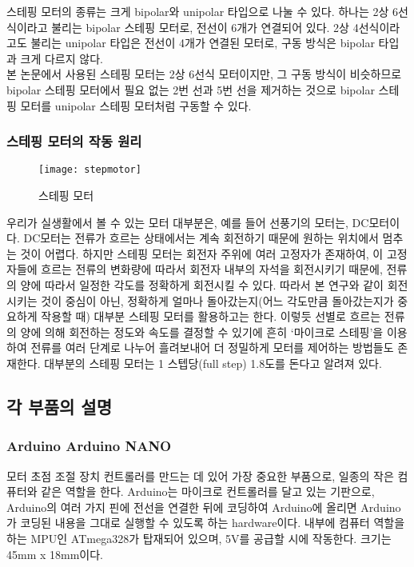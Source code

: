 스테핑 모터의 종류는 크게 bipolar와 unipolar 타입으로 나눌 수 있다. 하나는 2상 6선식이라고 불리는 bipolar 스테핑 모터로, 전선이 6개가 연결되어 있다. 2상 4선식이라고도 불리는 unipolar 타입은 전선이 4개가 연결된 모터로, 구동 방식은 bipolar 타입과 크게 다르지 않다.\\
본 논문에서 사용된 스테핑 모터는 2상 6선식 모터이지만, 그 구동 방식이 비슷하므로 bipolar 스테핑 모터에서 필요 없는 2번 선과 5번 선을 제거하는 것으로 bipolar 스테핑 모터를 unipolar 스테핑 모터처럼 구동할 수 있다.

\subsubsection{스테핑 모터의 작동 원리}

\begin{wrapfigure}{l}{0.5\textwidth}
	\texttt{[image: stepmotor]}
	\caption{스테핑 모터}
	\label{fig:stepmotor}
\end{wrapfigure}
우리가 실생활에서 볼 수 있는 모터 대부분은, 예를 들어 선풍기의 모터는, DC모터이다. DC모터는 전류가 흐르는 상태에서는 계속 회전하기 때문에 원하는 위치에서 멈추는 것이 어렵다. 하지만 스테핑 모터는 회전자 주위에 여러 고정자가 존재하여, 이 고정자들에 흐르는 전류의 변화량에 따라서 회전자 내부의 자석을 회전시키기 때문에, 전류의 양에 따라서 일정한 각도를 정확하게 회전시킬 수 있다. 따라서 본 연구와 같이 회전시키는 것이 중심이 아닌, 정확하게 얼마나 돌아갔는지(어느 각도만큼 돌아갔는지가 중요하게 작용할 때) 대부분 스테핑 모터를 활용하고는 한다. 이렇듯 선별로 흐르는 전류의 양에 의해 회전하는 정도와 속도를 결정할 수 있기에 흔히 ‘마이크로 스테핑’을 이용하여 전류를 여러 단계로 나누어 흘려보내어 더 정밀하게 모터를 제어하는 방법들도 존재한다. 대부분의 스테핑 모터는 1 스텝당(full step) 1.8도를 돈다고 알려져 있다.

\subsection{각 부품의 설명}

\subsubsection{Arduino Arduino NANO}

모터 초점 조절 장치 컨트롤러를 만드는 데 있어 가장 중요한 부품으로, 일종의 작은 컴퓨터와 같은 역할을 한다. Arduino는 마이크로 컨트롤러를 달고 있는 기판으로, Arduino의 여러 가지 핀에 전선을 연결한 뒤에 코딩하여 Arduino에 올리면 Arduino가 코딩된 내용을 그대로 실행할 수 있도록 하는 hardware이다. 내부에 컴퓨터 역할을 하는 MPU인 ATmega328가 탑재되어 있으며, 5V를 공급할 시에 작동한다. 크기는 45mm x 18mm이다.

